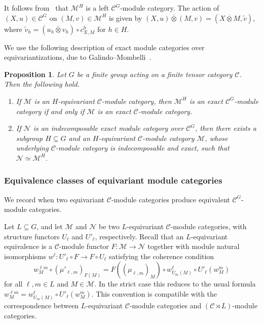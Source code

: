 \documentclass[12pt]{amsart}
\theoremstyle{plain}
\newtheorem{proposition}[theorem]{Proposition}
\theoremstyle{definition} %
\theoremstyle{remark} %
\newcommand{\cC}{\mathcal{C}}
\newcommand{\cM}{\mathcal{M}}
\newcommand{\cN}{\mathcal{N}}
\begin{document}
It follows from~\cite[Lemma 3.3]{GM11} that $\cM^H$ is a left $\cC^G$-module category. The action of $(X,u) \in \cC^G$ on $(M,v) \in \cM^H$ is given by $(X,u) \overline{\otimes} (M,v) = (X \overline{\otimes} M, \widetilde{v})$, where $\widetilde{v}_h = (u_h \overline{\otimes} v_h) \circ c^h_{X,M}$ for $h \in H$.


We use the following description of exact module categories over equivariantizations, due to Galindo--Mombelli~\cite[Proposition~3.4]{GM11}.

\begin{proposition}\label{prop:mod_cat_equivariantization}
Let $G$ be a finite group acting on a finite tensor category $\cC$. Then the following hold.
\begin{enumerate}
\item If $\cM$ is an $H$-equivariant $\cC$-module category, then $\cM^H$ is an exact $\cC^G$-module category if and only if $\cM$ is an exact $\cC$-module category.
\item If $\cN$ is an indecomposable exact module category over $\cC^G$, then there exists a subgroup $H \subseteq G$ and an $H$-equivariant $\cC$-module category $\cM$, whose underlying $\cC$-module category is indecomposable and exact, such that $\cN \simeq \cM^H$.
\end{enumerate}
\end{proposition}


\subsubsection{Equivalence classes of equivariant module categories}

We record when two equivariant $\cC$-module categories produce equivalent $\cC^G$-module categories.

Let $L\subseteq G$, and let $\cM$ and $\cN$ be two $L$-equivariant $\cC$-module categories, with structure functors $U_\ell$ and $U'_\ell$, respectively. Recall that an $L$-equivariant equivalence is a $\cC$-module functor $F:\cM\to \cN$ together with module natural isomorphisms $w^\ell: U'_\ell\circ F\to F\circ U_\ell$ satisfying the coherence condition
\[
w^{\ell m}_M\circ(\mu'_{\ell,m})_{F(M)}
=F((\mu_{\ell,m})_M)\circ w^\ell_{U_m(M)}\circ U'_\ell(w^m_M)
\]
for all $\ell,m\in L$ and $M\in \cM$. In the strict case this reduces to the usual formula $w^{\ell m}_M=w^\ell_{U_m(M)}\circ U'_\ell(w^m_M)$. This convention is compatible with the correspondence between $L$-equivariant $\cC$-module categories and $(\cC\rtimes L)$-module categories.
\end{document}
